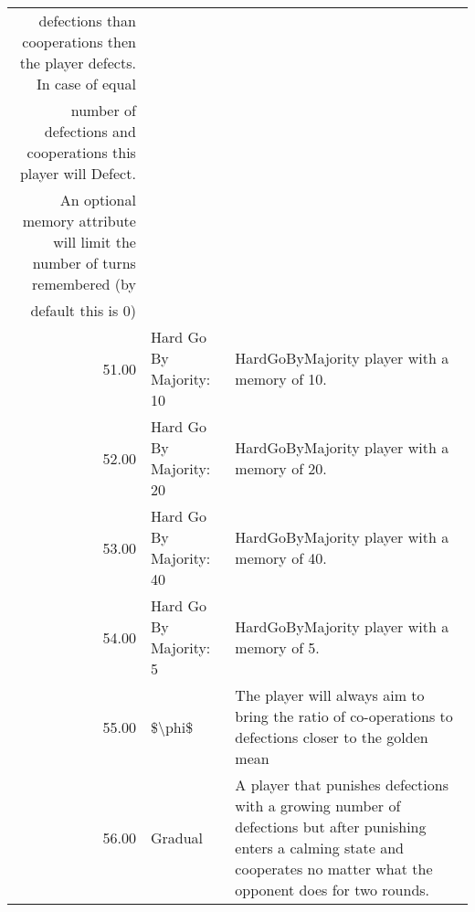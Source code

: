 \begin{table}[!hbtp]
\begin{adjustbox}{width=2\textwidth, angle=90}
\begin{tabular}{rll}
	                                       defections than cooperations then the player defects. In case of equal \\
	                                       number of defections and cooperations this player will Defect. \\
	                                      An optional memory attribute will limit the number of turns remembered (by \\
	                                      default this is 0)                                                                                                                                                                                                                                                                                                                                                                                                                                                                                                                                                                                                                                                                                             \\
	51.00  & Hard Go By Majority: 10     & HardGoByMajority player with a memory of 10.                                                                                      \\
	52.00  & Hard Go By Majority: 20     & HardGoByMajority player with a memory of 20.                                                                                      \\
	53.00  & Hard Go By Majority: 40     & HardGoByMajority player with a memory of 40.                                                                                      \\
	54.00  & Hard Go By Majority: 5      & HardGoByMajority player with a memory of 5.                                                                                       \\
	55.00  & \$\textbackslash{}phi\$     & The player will always aim to bring the ratio of co-operations to defections closer to the golden mean                            \\
	56.00  & Gradual                     & A player that punishes defections with a growing number of defections
	but after punishing enters a calming state and cooperates no matter what
	the opponent does for two rounds.


\end{tabular}
\end{adjustbox}
\end{table}
